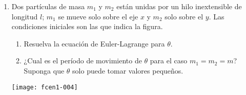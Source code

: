 \documentclass[11pt,spanish,a4paper]{article}
\begin{document}
\begin{enumerate}
\item \begin{minipage}[t][4.5cm]{0.6\textwidth}
Dos partículas de masa \(m_1\) y \(m_2\) están unidas por un hilo inextensible de longitud \(l\); \(m_1\) se mueve solo sobre el eje \(x\) y \(m_2\) solo sobre el \(y\).
Las condiciones iniciales son las que indica la figura.
	\begin{enumerate}
		\item Resuelva la ecuación de Euler-Lagrange para \(\theta\).
		\item ¿Cual es el período de movimiento de \(\theta\) para el caso \(m_1 = m_2 = m\)?
Suponga que \(\theta\) solo puede tomar valores pequeños.
  \end{enumerate}
\end{minipage}
\begin{minipage}[c][2em][t]{0.4\textwidth}
	\hspace{0.5cm}
   \texttt{[image: fcen1-004]}
\end{minipage}



%




\end{enumerate}
\end{document}
